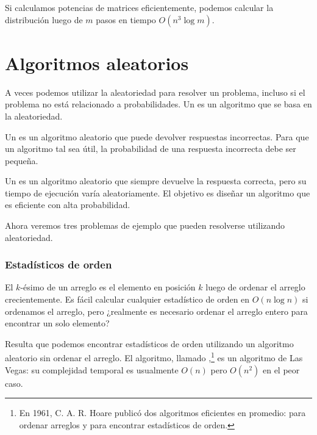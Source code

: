 Si calculamos potencias de matrices eficientemente, podemos calcular
la distribución luego de $m$ pasos en tiempo $O(n^3 \log m)$.

\section{Algoritmos aleatorios}


A veces podemos utilizar la aleatoriedad para resolver un problema,
incluso si el problema no está relacionado a probabilidades. Un
 es un algoritmo que se basa en la aleatoriedad.


Un  es un algoritmo aleatorio que puede
devolver respuestas incorrectas. Para que un algoritmo tal sea útil,
la probabilidad de una respuesta incorrecta debe ser pequeña.


Un  es un algoritmo aleatorio que siempre
devuelve la respuesta correcta, pero su tiempo de ejecución varía
aleatoriamente. El objetivo es diseñar un algoritmo que es eficiente
con alta probabilidad.

Ahora veremos tres problemas de ejemplo que pueden resolverse
utilizando aleatoriedad.

\subsubsection{Estadísticos de orden}


El $k$-ésimo  de un arreglo es el elemento
en posición $k$ luego de ordenar el arreglo crecientemente. Es fácil
calcular cualquier estadístico de orden en $O(n \log n)$ si ordenamos
el arreglo, pero ¿realmente es necesario ordenar el arreglo entero
para encontrar un solo elemento?


Resulta que podemos encontrar estadísticos de orden utilizando un
algoritmo aleatorio sin ordenar el arreglo. El algoritmo, llamado
,\footnote{En 1961, C. A. R. Hoare publicó
    dos algoritmos eficientes en promedio:  \cite{hoa61a}
    para ordenar arreglos y  \cite{hoa61b} para encontrar
    estadísticos de orden.} es un algoritmo de Las Vegas: su complejidad
temporal es usualmente $O(n)$ pero $O(n^2)$ en el peor caso.

